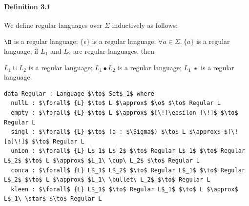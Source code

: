 \documentclass[twoside,openright,final]{bhamthesis}
\renewcommand{\item}{\itemindent0.5cm\itemold}
\begin{document}
\paragraph{Definition 3.1} We define regular languages over
\(\Sigma\) inductively as follows:
\begin{enumerate}
  \item \(\O\) is a regular language;
  \item \(\{\epsilon\}\) is a regular language;
  \item \(\forall a\in\Sigma.\ \{a\}\) is a regular language;
  \item if \(L_1\) and \(L_2\) are regular languages, then
    \begin{enumerate}
      \item \(L_1\cup L_2\) is a regular language;
      \item \(L_1\bullet L_2\) is a regular language;
      \item \(L_1\ \star\) is a regular language.
    \end{enumerate}
\end{enumerate}
\begin{lstlisting}[caption=Regular Language,mathescape=true]
data Regular : Language $\to$ Set$_1$ where
  nullL : $\forall$ {L} $\to$ L $\approx$ $\o$ $\to$ Regular L
  empty : $\forall$ {L} $\to$ L $\approx$ $[\![\epsilon ]\!]$ $\to$ Regular L
  singl : $\forall$ {L} $\to$ (a : $\Sigma$) $\to$ L $\approx$ $[\![a]\!]$ $\to$ Regular L
  union : $\forall$ {L} L$_1$ L$_2$ $\to$ Regular L$_1$ $\to$ Regular L$_2$ $\to$ L $\approx$ $L_1\ \cup\ L_2$ $\to$ Regular L
  conca : $\forall$ {L} L$_1$ L$_2$ $\to$ Regular L$_1$ $\to$ Regular L$_2$ $\to$ L $\approx$ $L_1\ \bullet\ L_2$ $\to$ Regular L
  kleen : $\forall$ {L} L$_1$ $\to$ Regular L$_1$ $\to$ L $\approx$ L$_1\ \star$ $\to$ Regular L
\end{lstlisting}
\end{document}
